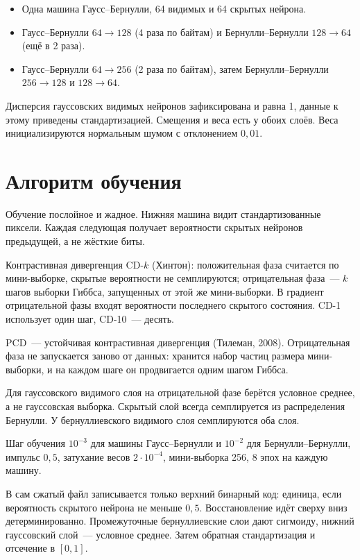 \documentclass[12pt,a4paper]{article}
\begin{document}
\begin{itemize}
\item Одна машина Гаусс--Бернулли, 64 видимых и 64 скрытых нейрона.
\item Гаусс--Бернулли $64 \to 128$ (4 раза по байтам) и Бернулли--Бернулли $128 \to 64$ (ещё в 2 раза).
\item Гаусс--Бернулли $64 \to 256$ (2 раза по байтам), затем Бернулли--Бернулли $256 \to 128$ и $128 \to 64$.
\end{itemize}

Дисперсия гауссовских видимых нейронов зафиксирована и равна 1, данные к этому приведены стандартизацией. Смещения и веса есть у обоих слоёв. Веса инициализируются нормальным шумом с отклонением $0{,}01$.

\section{Алгоритм обучения}

Обучение послойное и жадное. Нижняя машина видит стандартизованные пиксели. Каждая следующая получает вероятности скрытых нейронов предыдущей, а не жёсткие биты.

Контрастивная дивергенция CD-$k$ (Хинтон): положительная фаза считается по мини-выборке, скрытые вероятности не семплируются; отрицательная фаза~--- $k$ шагов выборки Гиббса, запущенных от этой же мини-выборки. В градиент отрицательной фазы входят вероятности последнего скрытого состояния. CD-1 использует один шаг, CD-10~--- десять.

PCD~--- устойчивая контрастивная дивергенция (Тилеман, 2008). Отрицательная фаза не запускается заново от данных: хранится набор частиц размера мини-выборки, и на каждом шаге он продвигается одним шагом Гиббса.

Для гауссовского видимого слоя на отрицательной фазе берётся условное среднее, а не гауссовская выборка. Скрытый слой всегда семплируется из распределения Бернулли. У бернуллиевского видимого слоя семплируются оба слоя.

Шаг обучения $10^{-3}$ для машины Гаусс--Бернулли и $10^{-2}$ для Бернулли--Бернулли, импульс $0{,}5$, затухание весов $2\cdot10^{-4}$, мини-выборка 256, 8 эпох на каждую машину.

В сам сжатый файл записывается только верхний бинарный код: единица, если вероятность скрытого нейрона не меньше $0{,}5$. Восстановление идёт сверху вниз детерминированно. Промежуточные бернуллиевские слои дают сигмоиду, нижний гауссовский слой~--- условное среднее. Затем обратная стандартизация и отсечение в $[0,1]$.
\end{document}
